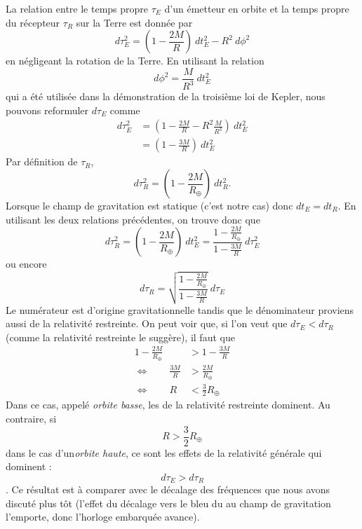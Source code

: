 \documentclass[a4paper,11pt]{report}
\begin{document}
        La relation entre le temps propre $\tau_E$ d'un émetteur en orbite et la temps propre du récepteur $\tau_R$ sur la Terre est donnée par
        \begin{equation}
            d\tau^2_E = \left( 1-\frac{2M}{R} \right)~dt^2_E-R^2~d\phi^2
        \end{equation}
        en négligeant la rotation de la Terre. En utilisant la relation
        \begin{equation}
            d\phi^2 = \frac{M}{R^3}~dt^2_E
        \end{equation}
        qui a été utilisée dans la démonstration de la troisième loi de Kepler, nous pouvons reformuler $d\tau_E$ comme
        \begin{align}
            d\tau^2_E &= \left( 1-\frac{2M}{R}-R^2\frac{M}{R^3} \right)~dt^2_E\\
            &= \left( 1-\frac{3M}{R} \right)~dt^2_E
        \end{align}
        Par définition de $\tau_R$, 
        \begin{equation}
            d\tau^2_R = \left( 1-\frac{2M}{R_\oplus} \right)~dt^2_R.
        \end{equation}
        Lorsque le champ de gravitation est statique (c'est notre cas) donc $dt_E = dt_R$. En utilisant les deux relations précédentes, on trouve donc que
        \begin{equation}
            d\tau^2_R = \left( 1-\frac{2M}{R_\oplus} \right)~dt^2_E = \frac{1-\frac{2M}{R_\oplus}}{1-\frac{3M}{R}}~d\tau^2_E
        \end{equation}
        ou encore
        \begin{equation}
            d\tau_R = \sqrt{\frac{1-\frac{2M}{R_\oplus}}{1-\frac{3M}{R}}}~d\tau_E
        \end{equation}
        Le numérateur est d'origine gravitationnelle tandis que le dénominateur proviens aussi de la relativité restreinte. On peut voir que, si l'on veut que $d\tau_E<d\tau_R$ (comme la relativité restreinte le suggère), il faut que
        \begin{align}
            1-\frac{2M}{R_\oplus} &> 1-\frac{3M}{R} \\
            \Leftrightarrow\qquad \frac{3M}{R} &> \frac{2M}{R_\oplus}\\
            \Leftrightarrow \qquad R &< \frac{3}{2}R_\oplus
        \end{align}
        Dans ce cas, appelé \textit{orbite basse}, les de la relativité restreinte dominent. Au contraire, si
        \begin{equation}
            R > \frac{3}{2}R_\oplus
        \end{equation}
        dans le cas d'un\textit{orbite haute}, ce sont les effets de la relativité générale qui dominent : $$d\tau_E>d\tau_R$$. Ce résultat est à comparer avec le décalage des fréquences que nous avons discuté plus tôt (l'effet du décalage vers le bleu du au champ de gravitation l'emporte, donc l'horloge embarquée avance).\\
        
\end{document}
